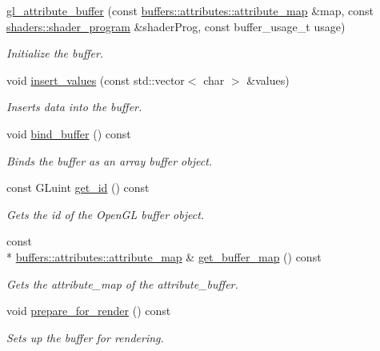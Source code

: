 \begin{DoxyCompactItemize}
\item 
\hyperlink{classoccluded_1_1opengl_1_1retained_1_1gl__attribute__buffer_a22cdc11d70684a364895715b12293487}{gl\+\_\+attribute\+\_\+buffer} (const \hyperlink{classoccluded_1_1buffers_1_1attributes_1_1attribute__map}{buffers\+::attributes\+::attribute\+\_\+map} \&map, const \hyperlink{classoccluded_1_1opengl_1_1retained_1_1shaders_1_1shader__program}{shaders\+::shader\+\_\+program} \&shader\+Prog, const buffer\+\_\+usage\+\_\+t usage)
\begin{DoxyCompactList}\small\item\em Initialize the buffer. \end{DoxyCompactList}\item 
void \hyperlink{classoccluded_1_1opengl_1_1retained_1_1gl__attribute__buffer_afd58deefb5659c0cd9a316263515b68f}{insert\+\_\+values} (const std\+::vector$<$ char $>$ \&values)
\begin{DoxyCompactList}\small\item\em Inserts data into the buffer. \end{DoxyCompactList}\item 
void \hyperlink{classoccluded_1_1opengl_1_1retained_1_1gl__attribute__buffer_a0bc941bf7603a80ea249cd1d64cc2b67}{bind\+\_\+buffer} () const 
\begin{DoxyCompactList}\small\item\em Binds the buffer as an array buffer object. \end{DoxyCompactList}\item 
const G\+Luint \hyperlink{classoccluded_1_1opengl_1_1retained_1_1gl__attribute__buffer_ab23624ebadcabdcb0d028e2fe0039ffd}{get\+\_\+id} () const 
\begin{DoxyCompactList}\small\item\em Gets the id of the Open\+G\+L buffer object. \end{DoxyCompactList}\item 
const \\*
\hyperlink{classoccluded_1_1buffers_1_1attributes_1_1attribute__map}{buffers\+::attributes\+::attribute\+\_\+map} \& \hyperlink{classoccluded_1_1opengl_1_1retained_1_1gl__attribute__buffer_a1241841aa913b0df057b5d885f1447b4}{get\+\_\+buffer\+\_\+map} () const 
\begin{DoxyCompactList}\small\item\em Gets the attribute\+\_\+map of the attribute\+\_\+buffer. \end{DoxyCompactList}\item 
void \hyperlink{classoccluded_1_1opengl_1_1retained_1_1gl__attribute__buffer_ab7707122e284ee1c28bf238885ae6a59}{prepare\+\_\+for\+\_\+render} () const 
\begin{DoxyCompactList}\small\item\em Sets up the buffer for rendering. \end{DoxyCompactList}\end{DoxyCompactItemize}


